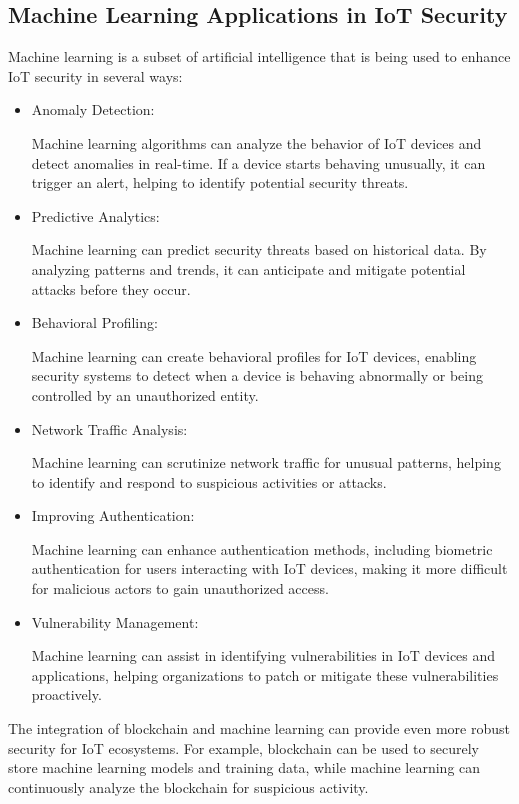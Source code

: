 \documentclass[conference]{IEEEtran}
\begin{document}
\subsection{Machine Learning Applications in IoT Security} 
Machine learning is a subset of artificial intelligence that is being used to enhance IoT security in several ways:

\begin{itemize}
    \item Anomaly Detection: 
    
    Machine learning algorithms can analyze the behavior of IoT devices and detect anomalies in real-time. If a device starts behaving unusually, it can trigger an alert, helping to identify potential security threats.
    \item Predictive Analytics:
    
    Machine learning can predict security threats based on historical data. By analyzing patterns and trends, it can anticipate and mitigate potential attacks before they occur.
    \item Behavioral Profiling:
    
    Machine learning can create behavioral profiles for IoT devices, enabling security systems to detect when a device is behaving abnormally or being controlled by an unauthorized entity.
    \item Network Traffic Analysis: 
    
    Machine learning can scrutinize network traffic for unusual patterns, helping to identify and respond to suspicious activities or attacks.
    \item Improving Authentication:
    
    Machine learning can enhance authentication methods, including biometric authentication for users interacting with IoT devices, making it more difficult for malicious actors to gain unauthorized access.
    \item Vulnerability Management: 
    
    Machine learning can assist in identifying vulnerabilities in IoT devices and applications, helping organizations to patch or mitigate these vulnerabilities proactively.

\end{itemize}

The integration of blockchain and machine learning can provide even more robust security for IoT ecosystems. For example, blockchain can be used to securely store machine learning models and training data, while machine learning can continuously analyze the blockchain for suspicious activity.
\end{document}
